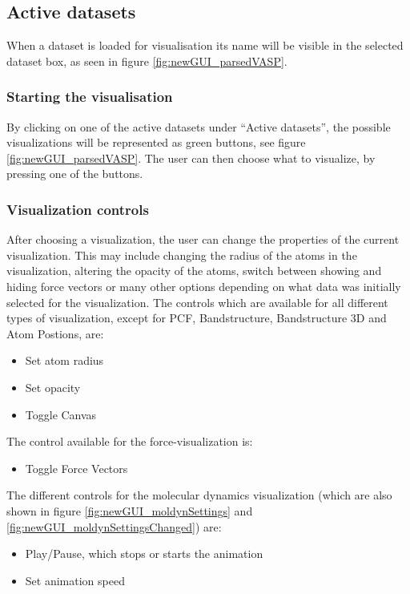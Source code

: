 \subsection{Active datasets}
When a dataset is loaded for visualisation its name will be visible in the selected dataset box, as seen in figure \ref{fig:newGUI_parsedVASP}. 

\subsubsection{Starting the visualisation}
By clicking on one of the active datasets under ``Active datasets'', the possible visualizations will be represented as green buttons, see figure \ref{fig:newGUI_parsedVASP}. The user can then choose what to visualize, by pressing one of the buttons. 

\subsubsection{Visualization controls}
After choosing a visualization, the user can change the properties of the current visualization. This may include changing the radius of the atoms in the visualization, altering the opacity of the atoms, switch between showing and hiding force vectors or many other options depending on what data was initially selected for the visualization. \newline \newline
The controls which are available for all different types of visualization, except for PCF, Bandstructure, Bandstructure 3D and Atom Postions, are:
\begin{itemize}
  \item Set atom radius
  \item Set opacity
  \item Toggle Canvas
\end{itemize}

The control available for the force-visualization is:
\begin{itemize}
  \item Toggle Force Vectors
\end{itemize}

The different controls for the molecular dynamics visualization (which are also shown in figure \ref{fig:newGUI_moldynSettings} and \ref{fig:newGUI_moldynSettingsChanged}) are:
\begin{itemize}
  \item Play/Pause, which stops or starts the animation
  \item Set animation speed
\end{itemize}

